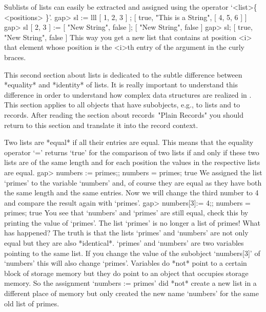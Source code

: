 Sublists of lists can easily be extracted and assigned using the operator
`<list>\{ <positions> \}'.
\beginexample
    gap> sl := lll{ [ 1, 2, 3 ] };
    [ true, "This is a String", [ 4, 5, 6 ] ]
    gap> sl{ [ 2, 3 ] } := [ "New String", false ];
    [ "New String", false ]
    gap> sl;
    [ true, "New String", false ] 
\endexample
This way you get  a new list that  contains at position <i> that  element
whose position is the <i>th entry of the argument in the curly braces.


%
This second  section  about lists is dedicated  to  the subtle difference
between  *equality*  and *identity*  of lists. It is really important to
understand   this  difference in  order   to  understand how complex data
structures are  realized in {\GAP}.   This section applies  to all {\GAP}
objects  that have  subobjects,  e.g.,  to lists   and to  records. After
reading the section about records~"Plain Records" you should return to
this section and translate it into the record context.

Two  lists are *equal* if all their entries are equal.  This means that the
equality operator `=' returns `true' for the  comparison of  two lists if
and  only if these two lists are of the same length and for each position
the values in the respective lists are equal.
\beginexample
    gap> numbers := primes;; numbers = primes;
    true 
\endexample
We assigned  the  list `primes' to the variable  `numbers' and, of course
they are equal as they have  both  the same length  and the same entries.
Now we  will change the  third number to  4 and  compare the result again
with `primes'.
\beginexample
    gap> numbers[3]:= 4;; numbers = primes;
    true 
\endexample
You  see that  `numbers' and  `primes'  are still   equal, check this  by
printing the value of `primes'. The list `primes' is  no longer a list of
primes! What has  happened?  The truth is  that  the  lists  `primes' and
`numbers' are  not only equal but they are also *identical*. `primes' and
`numbers' are two variables pointing to the  same list. If you change the
value of  the subobject `numbers[3]'  of `numbers' this will  also change
`primes'.  Variables do *not* point to  a certain block of storage memory
but they do  point  to an object that  occupies  storage memory.   So the
assignment `numbers := primes' did *not* create a new list in a different
place of memory but only created the new name `numbers'  for the same old
list of primes.

